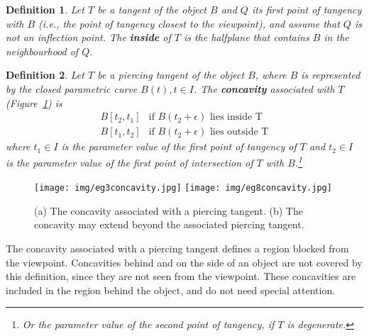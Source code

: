 \documentclass[10pt,twocolumn]{article}
\newtheorem{defn2}{Definition}
\newif\ifJournal
\begin{document}
\ifJournal
The tangent in Figure~\ref{} is not piercing: EG9B.
\fi

\begin{defn2}
\label{defn:inside}
Let $T$ be a tangent of the object $B$ and $Q$ its first point of tangency with $B$
(i.e., the point of tangency closest to the viewpoint),
and assume that $Q$ is not an inflection point.
The {\bf inside} of $T$ is the halfplane that contains $B$
in the neighbourhood of $Q$.
\end{defn2}

\begin{defn2} 
\label{defn:concavity}
Let $T$ be a piercing tangent of the object $B$,
where $B$ is represented by the closed parametric curve $B(t), t \in I$.
The {\bf concavity} associated with $T$ (Figure~\ref{fig:concavity}) is
\begin{eqnarray}
   B[t_2,t_1]  & \mbox{if } B(t_2 + \epsilon) \mbox{ lies inside T} \\
   B[t_1,t_2]  & \mbox{if } B(t_2 + \epsilon) \mbox{ lies outside T}
\end{eqnarray}
where $t_1 \in I$ is the parameter value of the first point of tangency of $T$
and $t_2 \in I$ is the parameter value of the first point of intersection of $T$ 
with $B$.\footnote{Or the parameter value of the second point of tangency, 
  if $T$ is degenerate.}
\end{defn2}

\begin{figure}
\begin{center}
\texttt{[image: img/eg3concavity.jpg]}
\texttt{[image: img/eg8concavity.jpg]}
\end{center}
\caption{(a) The concavity associated with a piercing tangent.
         (b) The concavity may extend beyond the associated piercing tangent.}
\label{fig:concavity}
\end{figure}

The concavity associated with a piercing tangent defines a region blocked from the
viewpoint.
Concavities behind and on the side of an object are not covered
by this definition, since they are not seen from the viewpoint.
These concavities are included in the region behind the object, and do
not need special attention.
 
\end{document}
